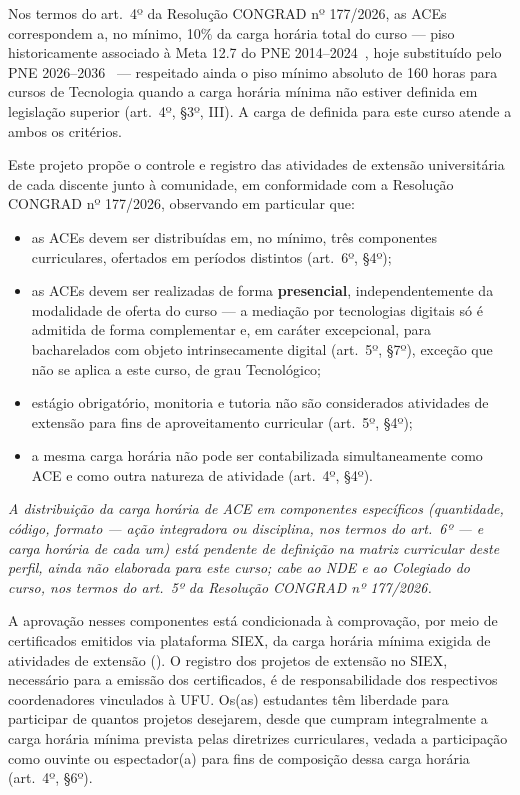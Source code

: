 Nos termos do art.\ 4º da Resolução CONGRAD nº 177/2026, as ACEs correspondem a, no mínimo, 10\% da carga horária total do curso — piso historicamente associado à Meta 12.7 do PNE 2014--2024~\cite{mec_pne_2014}, hoje substituído pelo PNE 2026--2036~\cite{mec_pne_2026} — respeitado ainda o piso mínimo absoluto de 160 horas para cursos de Tecnologia quando a carga horária mínima não estiver definida em legislação superior (art.\ 4º, §3º, III). A carga de \textbf{} definida para este curso atende a ambos os critérios.

Este projeto propõe o controle e registro das atividades de extensão universitária de cada discente junto à comunidade, em conformidade com a Resolução CONGRAD nº 177/2026, observando em particular que:

\begin{itemize}
    \item as ACEs devem ser distribuídas em, no mínimo, três componentes curriculares, ofertados em períodos distintos (art.\ 6º, §4º);
    \item as ACEs devem ser realizadas de forma \textbf{presencial}, independentemente da modalidade de oferta do curso — a mediação por tecnologias digitais só é admitida de forma complementar e, em caráter excepcional, para bacharelados com objeto intrinsecamente digital (art.\ 5º, §7º), exceção que não se aplica a este curso, de grau Tecnológico;
    \item estágio obrigatório, monitoria e tutoria não são considerados atividades de extensão para fins de aproveitamento curricular (art.\ 5º, §4º);
    \item a mesma carga horária não pode ser contabilizada simultaneamente como ACE e como outra natureza de atividade (art.\ 4º, §4º).
\end{itemize}

\textit{A distribuição da carga horária de ACE em componentes específicos (quantidade, código, formato --- ação integradora ou disciplina, nos termos do art.\ 6º --- e carga horária de cada um) está pendente de definição na matriz curricular deste perfil, ainda não elaborada para este curso; cabe ao NDE e ao Colegiado do curso, nos termos do art.\ 5º da Resolução CONGRAD nº 177/2026.}

A aprovação nesses componentes está condicionada à comprovação, por meio de certificados emitidos via plataforma SIEX, da carga horária mínima exigida de atividades de extensão (\unskip). O registro dos projetos de extensão no SIEX, necessário para a emissão dos certificados, é de responsabilidade dos respectivos coordenadores vinculados à UFU. Os(as) estudantes têm liberdade para participar de quantos projetos desejarem, desde que cumpram integralmente a carga horária mínima prevista pelas diretrizes curriculares, vedada a participação como ouvinte ou espectador(a) para fins de composição dessa carga horária (art.\ 4º, §6º).

